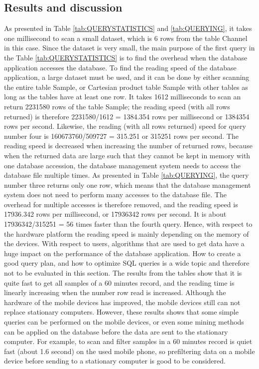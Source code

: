 \subsection{Results and discussion}
As presented in Table \ref{tab:QUERYSTATISTICS} and \ref{tab:QUERYING}, it takes one millisecond to scan a small dataset, which is 6 rows from the table Channel in this case. Since the dataset is very small, the main purpose of the first query in the Table \ref{tab:QUERYSTATISTICS} is to find the overhead when the database application accesses the database. To find the reading speed of the database application, a large dataset must be used, and it can be done by either scanning the entire table Sample, or Cartesian product table Sample with other tables as long as the tables have at least one row. It takes 1612 milliseconds to scan an return 2231580 rows of the table Sample; the reading speed (with all rows returned) is therefore 2231580/1612 = 1384.354 rows per millisecond or 1384354 rows per second. Likewise, the reading (with all rows returned) speed for query number four is 160673760/509727 = 315.251 or 315251 rows per second. The reading speed is decreased when increasing the number of returned rows, because when the returned data are large such that they cannot be kept in memory with one database accession, the database management system needs to access the database file multiple times. As presented in Table \ref{tab:QUERYING}, the query number three returns only one row, which means that the database management system does not need to perform many accesses to the database file. The overhead for multiple accesses is therefore removed, and the reading speed is 17936.342 rows per millisecond, or 17936342 rows per second. It is about 17936342/315251 = 56 times faster than the fourth query. Hence, with respect to the hardware platform the reading speed is mainly depending on the memory of the devices. With respect to users, algorithms that are used to get data have a huge impact on the performance of the database application. How to create a good query plan, and how to optimize SQL queries is a wide topic and therefore not to be evaluated in this section. The results from the tables show that it is quite fast to get all samples of a 60 minutes record, and the reading time is linearly increasing when the number row read is increased. Although the hardware of the mobile devices has improved, the mobile devices still can not replace stationary computers. However, these results shows that some simple queries can be performed on the mobile devices, or even some mining methods can be applied on the database before the data are sent to the stationary computer. For example, to scan and filter samples in a 60 minutes record is quiet fast (about 1.6 second) on the used mobile phone, so prefiltering data on a mobile device before sending to a stationary computer is good to be considered.\\
